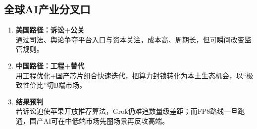 \subsection{全球AI产业分叉口}
\begin{enumerate}[leftmargin=*, nosep]
    \item \textbf{美国路径：诉讼+公关}  \\
    通过司法、舆论争夺平台入口与资本关注，成本高、周期长，但可瞬间改变监管规则。
    \item \textbf{中国路径：工程+替代}  \\
    用工程优化+国产芯片组合快速迭代，把算力封锁转化为本土生态机会，以“极致性价比”切B端市场。
    \item \textbf{结果预判}  \\
    若诉讼迫使苹果开放推荐算法，Grok仍难追数量级差距；而FP8路线一旦跑通，国产AI可在中低端市场先圈场景再反攻高端。
\end{enumerate}